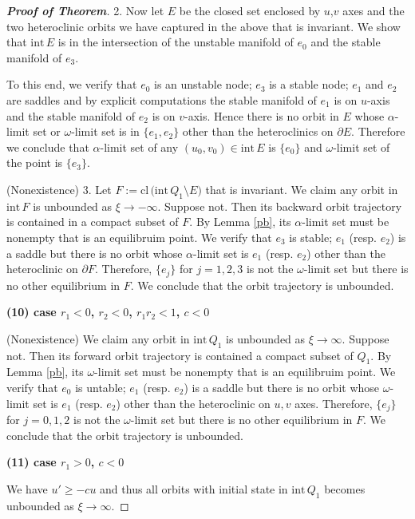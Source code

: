 \documentclass{amsart}
\theoremstyle{definition}
\numberwithin{equation}{section}
\def\ii{{\textrm{int}}\,}
\def\cl{{\textrm{cl}}\,}
\begin{document}
\begin{proof}[\textbf{Proof of Theorem}]
2. Now let $E$ be the closed set enclosed by $u$,$v$ axes and the two heteroclinic orbits we have captured in the above that is invariant. We show that $\ii E$ is in the intersection of the unstable manifold of $e_0$ and the stable manifold of $e_3$. 

To this end, we verify that $e_0$ is an unstable node; $e_3$ is a stable node; $e_1$ and $e_2$ are saddles and by explicit computations the stable manifold of $e_1$ is on $u$-axis and the stable manifold of $e_2$ is on $v$-axis. Hence there is no orbit in $E$ whose $\alpha$-limit set or $\omega$-limit set is in $\{e_1,e_2\}$ other than the heteroclinics on $\partial E$. Therefore we conclude that $\alpha$-limit set of any $(u_0,v_0) \in\ii E$ is $\{e_0\}$ and $\omega$-limit set of the point is $\{e_3\}$.

(Nonexistence) 3. Let $F:= \cl\big(\ii Q_1 \setminus E\big)$ that is invariant. We claim any orbit in $\ii F$ is unbounded as $\xi \rightarrow -\infty$. Suppose not. Then its backward orbit trajectory is contained in a compact subset of $F$. By Lemma \ref{pb}, its $\alpha$-limit set must be nonempty that is an equilibruim point. We verify that $e_3$ is stable; $e_1$ (resp. $e_2$) is a saddle but there is no orbit whose $\alpha$-limit set is $e_1$ (resp. $e_2$) other than the heteroclinic on $\partial F$. Therefore, $\{e_j\}$ for $j=1,2,3$ is not the $\omega$-limit set but there is no other equilibrium in $F$. We conclude that the orbit trajectory is unbounded.
\bigskip

\textbf{(10) \boldmath case $r_1<0$, $r_2<0$, $r_1r_2<1$, $c<0$}

\bigskip
(Nonexistence) We claim any orbit in $\ii Q_1$ is unbounded as $\xi \rightarrow \infty$. Suppose not. Then its forward orbit trajectory is contained a compact subset of $Q_1$. By Lemma \ref{pb}, its $\omega$-limit set must be nonempty that is an equilibruim point. We verify that $e_0$ is untable; $e_1$ (resp. $e_2$) is a saddle but there is no orbit whose $\omega$-limit set is $e_1$ (resp. $e_2$) other than the heteroclinic on $u,v$ axes. Therefore, $\{e_j\}$ for $j=0,1,2$ is not the $\omega$-limit set but there is no other equilibrium in $F$. We conclude that the orbit trajectory is unbounded.


\bigskip


\textbf{(11) \boldmath case $r_1>0$, $c<0$}

We have $u' \ge -c u$ and thus all orbits with initial state in $\ii Q_1$ becomes unbounded as $\xi \rightarrow \infty.$

\end{proof}
\newpage
\end{document}
